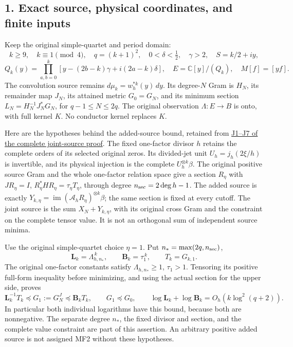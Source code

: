 \documentclass[11pt]{article}
\begin{document}
\subsection{1. Exact source, physical coordinates, and finite inputs}\label{exact-source-physical-coordinates-and-finite-inputs}

Keep the original simple-quartet and period domain: \[
k\ge9,\quad k\equiv1\pmod4,\quad q=(k+1)^2,\quad
0<\delta<\tfrac12,\quad\gamma>2,\quad S=k/2+iy,
\] \[
Q_k(y)=\prod_{a,b=0}^k[y-(2b-k)\gamma+i(2a-k)\delta],
\quad E=\mathbb C[y]/(Q_k),\quad M[f]=[yf].
\tag{MF1}
\] The convolution source remains \(d\mu_k=w_h^{*k}(y)\,dy\). Its degree-\(N\) Gram is \(H_N\), its remainder map \(J_N\), its attained metric \(G_0=G_N\), and its minimum section \(L_N=H_N^{-1}J_N^*G_N\), for \(q-1\le N\le2q\). The original observation \(\Lambda:E\to B\) is onto, with full kernel \(K\). No conductor kernel replaces \(K\).

Here are the hypotheses behind the added-source bound, retained from \href{https://github.com/KokunoYumeto/zeta-function-research-reader/blob/f1ad8be11f329a12d562420edfa58fa464948ee2/workbenches/splitzero-tandem/continuations/20260921-uniform-source-family/JOINT_MINIMUM_COMPLETE.tex\#L607}{J1--J7 of the complete joint-source proof}. The fixed one-factor divisor \(h\) retains the complete orders of its selected original zeros. Its divided-jet unit \(U_h=j_h(2\xi/h)\) is invertible, and its physical injection is the complete \(U_h^{\otimes k}\beta\). The original positive source Gram and the whole one-factor relation space give a section \(R_\eta\) with \(JR_\eta=I\), \(R_\eta^*HR_\eta=\tau_\eta T_\eta\), through degree \(n_{\rm sec}=2\deg h-1\). The added source is exactly \(Y_{k,\eta}=\operatorname{im}(\mathcal A_hR_\eta)^{\otimes k}\beta\); the same section is fixed at every cutoff. The joint source is the sum \(X_N+Y_{k,\eta}\), with its original cross Gram and the constraint on the complete tensor value. It is not an orthogonal sum of independent source minima.

Use the original simple-quartet choice \(\eta=1\). Put \(n_*=\max(2q,n_{\rm sec})\), \[
\mathbf L_k=\Lambda_{h,n_*}^{\,k},\qquad
\mathbf B_k=\tau_1^{\,k},\qquad
T_k=G_{k,1}.
\] The original one-factor constants satisfy \(\Lambda_{h,n_*}\ge1\), \(\tau_1>1\). Tensoring its positive full-form inequality before minimizing, and using the actual section for the upper side, proves \[
\mathbf L_k^{-1}T_k\preceq G_1:=G_N^J\preceq\mathbf B_kT_k,\qquad
G_1\preceq G_0,\qquad
\log\mathbf L_k+\log\mathbf B_k=O_h(k\log^2(q+2)).
\tag{MF2}
\] In particular both individual logarithms have this bound, because both are nonnegative. The separate degree \(n_*\), the fixed divisor and section, and the complete value constraint are part of this assertion. An arbitrary positive added source is not assigned MF2 without these hypotheses.
\end{document}
